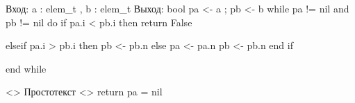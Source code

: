 Вход: a : \pointer elem_t , b : \pointer elem_t 
Выход: bool 
pa <- a ; pb <- b 
while pa != nil and pb != nil do 
if pa.i < pb.i then 
return False 

elseif pa.i > pb.i then 
pb <- pb.n 
else 
pa <- pa.n 
pb <- pb.n 
end if 

end while 

<\cb> Простотекст <\ce> 
return pa = nil 

